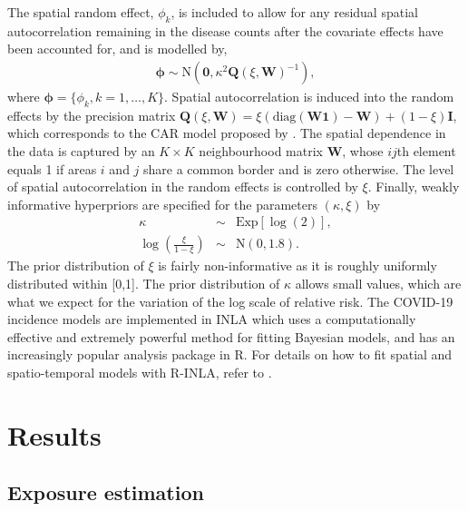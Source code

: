 \documentclass[12,]{article}
\begin{document}
The spatial random effect, \(\phi_{k}\), is included to allow for any
residual spatial autocorrelation remaining in the disease counts after
the covariate effects have been accounted for, and is modelled by,
\begin{eqnarray}\label{eq:model2}
\symbf{\phi} \sim \mbox{N}\left(\symbf{0},\kappa^2 \symbf{Q}(\xi,\symbf{W})^{-1}\right),
\end{eqnarray} where \(\symbf{\phi}=\{\phi_k, k=1,\dots, K\}\). Spatial
autocorrelation is induced into the random effects by the precision
matrix
\(\symbf{Q}(\xi,\symbf{W})=\xi(\mbox{diag}(\symbf{W}\symbf{1})-\symbf{W})+(1-\xi)\symbf{I}\),
which corresponds to the CAR model proposed by \textcite{Leroux1999}.
The spatial dependence in the data is captured by an \(K \times K\)
neighbourhood matrix \(\symbf{W}\), whose \(ij\)th element equals 1 if
areas \(i\) and \(j\) share a common border and is zero otherwise. The
level of spatial autocorrelation in the random effects is controlled by
\(\xi\). Finally, weakly informative hyperpriors are specified for the
parameters \((\kappa,\xi)\) by \begin{eqnarray}\label{eq:model3}
\kappa &\sim &  \mbox{Exp}[\log(2)],\\\nonumber
\log\left(\frac{\xi}{1-\xi}\right) &\sim & \mbox{N}(0,1.8).
\end{eqnarray} The prior distribution of \(\xi\) is fairly
non-informative as it is roughly uniformly distributed within {[}0,1{]}.
The prior distribution of \(\kappa\) allows small values, which are what
we expect for the variation of the log scale of relative risk. The
COVID-19 incidence models are implemented in INLA \autocite{Rue2009}
which uses a computationally effective and extremely powerful method for
fitting Bayesian models, and has an increasingly popular analysis
package in R. For details on how to fit spatial and spatio-temporal
models with R-INLA, refer to \textcite{Blangiardo2013}.

\hypertarget{sec:results}{%
\section{Results}\label{sec:results}}

\hypertarget{exposure-estimation}{%
\subsection{Exposure estimation}\label{exposure-estimation}}
\end{document}
